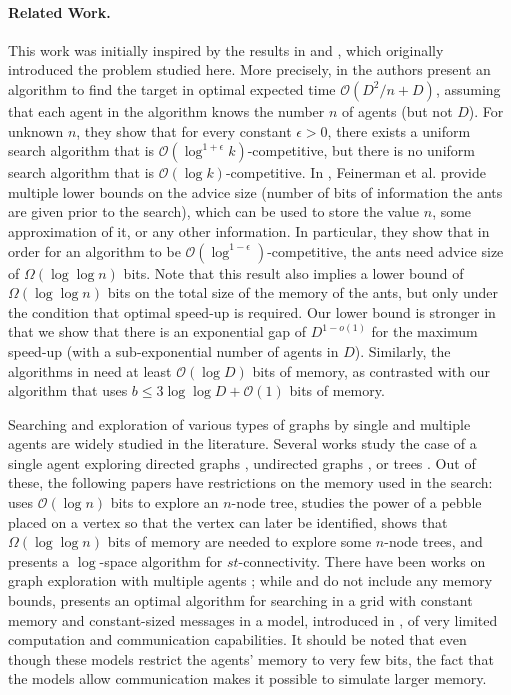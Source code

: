 \documentclass[11pt]{article}
\newcommand{\BO}{\mathcal{O}}
\begin{document}
\paragraph{Related Work.}

This work was initially inspired by the results in \cite{feinerman12disc} and \cite{feinerman12podc}, which originally introduced the problem studied here. More precisely, in \cite{feinerman12podc} the authors present an algorithm to find the target in optimal expected time $\BO(D^2/n + D)$, assuming that each agent in the algorithm knows the number $n$ of agents (but not $D$). For unknown $n$, they show that for every constant $\epsilon > 0$, there exists a uniform search algorithm that is $\BO(\log^{1+\epsilon} k)$-competitive, but there is no uniform search algorithm that is $\BO(\log k)$-competitive. In \cite{feinerman12disc}, Feinerman et al. provide multiple lower bounds on the advice size (number of bits of information the ants are given prior to the search), which can be used to store the value $n$, some approximation of it, or any other information. In particular, they show that in order for an algorithm to be $\BO(\log^{1-\epsilon})$-competitive, the ants need advice size of $\Omega(\log \log n)$ bits. Note that this result also implies a lower bound of $\Omega(\log \log n)$ bits on the total size of the memory of the ants, but only under the condition that optimal speed-up is required. Our lower bound is stronger in that we show that there is an exponential gap of $D^{1-o(1)}$ for the maximum speed-up (with a sub-exponential number of agents in $D$). Similarly, the algorithms in \cite{feinerman12podc} need at least $\BO(\log D)$ bits of memory, as contrasted with our algorithm that uses $b \leq 3 \log \log D + \BO(1)$ bits of memory. 

 Searching and exploration of various types of graphs by single and multiple agents are widely studied in the literature. Several works study the case of a single agent exploring directed graphs \cite{albers00, bender98, deng90}, undirected graphs \cite{panaite19, reingold05}, or trees \cite{diks02, gasieniec07}. Out of these, the following papers have restrictions on the memory used in the search: \cite{gasieniec07} uses $\BO(\log n)$ bits to explore an $n$-node tree, \cite{bender98} studies the power of a pebble placed on a vertex so that the vertex can later be identified, \cite{diks02} shows that $\Omega(\log \log n)$ bits of memory are needed to explore some $n$-node trees, and \cite{reingold05} presents a $\log$-space algorithm for $st$-connectivity. There have been works on graph exploration with multiple agents \cite{alon08, emek13, fraigniaud06}; while \cite{alon08} and \cite{fraigniaud06} do not include any memory bounds, \cite{emek13} presents an optimal algorithm for searching in a grid with constant memory and constant-sized messages in a model, introduced in \cite{emek13podc}, of very limited computation and communication capabilities. It should be noted that even though these models restrict the agents' memory to very few bits, the fact that the models allow communication makes it possible to simulate larger memory. 
 
\end{document}
